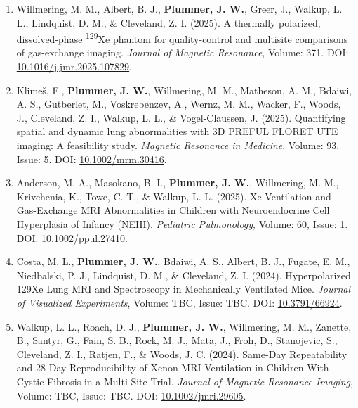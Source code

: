 \documentclass[12pt,]{scrartcl}
\begin{document}
\begin{enumerate}
    \item Willmering, M. M., Albert, B. J., \textbf{Plummer, J. W.}, Greer, J., Walkup, L. L., Lindquist, D. M., \& Cleveland, Z. I. (2025). A thermally polarized, dissolved-phase \textsuperscript{129}Xe phantom for quality-control and multisite comparisons of gas-exchange imaging. \textit{Journal of Magnetic Resonance}, Volume: 371. DOI: \href{https://doi.org/10.1016/j.jmr.2025.107829}{10.1016/j.jmr.2025.107829}.

    \item Klimeš, F., \textbf{Plummer, J. W.}, Willmering, M. M., Matheson, A. M., Bdaiwi, A. S., Gutberlet, M., Voskrebenzev, A., Wernz, M. M., Wacker, F., Woods, J., Cleveland, Z. I., Walkup, L. L., \& Vogel-Claussen, J. (2025). Quantifying spatial and dynamic lung abnormalities with 3D PREFUL FLORET UTE imaging: A feasibility study. \textit{Magnetic Resonance in Medicine}, Volume: 93, Issue: 5. DOI: \href{https://doi.org/10.1002/mrm.30416}{10.1002/mrm.30416}.

    \item Anderson, M. A., Masokano, B. I., \textbf{Plummer, J. W.}, Willmering, M. M., Krivchenia, K., Towe, C. T., \& Walkup, L. L. (2025). Xe Ventilation and Gas-Exchange MRI Abnormalities in Children with Neuroendocrine Cell Hyperplasia of Infancy (NEHI). \textit{Pediatric Pulmonology}, Volume: 60, Issue: 1. DOI: \href{https://doi.org/10.1002/ppul.27410}{10.1002/ppul.27410}.


    \item Costa, M. L., \textbf{Plummer, J. W.}, Bdaiwi, A. S., Albert, B. J., Fugate, E. M., Niedbalski, P. J., Lindquist, D. M., \& Cleveland, Z. I. (2024). Hyperpolarized 129Xe Lung MRI and Spectroscopy in Mechanically Ventilated Mice. \textit{Journal of Visualized Experiments}, Volume: TBC, Issue: TBC. DOI: \href{https://app.jove.com/t/66924/hyperpolarized-129xe-lung-mri-spectroscopy-mechanically-ventilated}{10.3791/66924}.

    \item Walkup, L. L., Roach, D. J., \textbf{Plummer, J. W.}, Willmering, M. M., Zanette, B., Santyr, G., Fain, S. B., Rock, M. J., Mata, J., Froh, D., Stanojevic, S., Cleveland, Z. I., Ratjen, F., \& Woods, J. C. (2024). Same-Day Repeatability and 28-Day Reproducibility of Xenon MRI Ventilation in Children With Cystic Fibrosis in a Multi-Site Trial. \textit{Journal of Magnetic Resonance Imaging}, Volume: TBC, Issue: TBC. DOI: \href{https://doi.org/10.1002/jmri.29605}{10.1002/jmri.29605}.


\end{enumerate}
\end{document}
